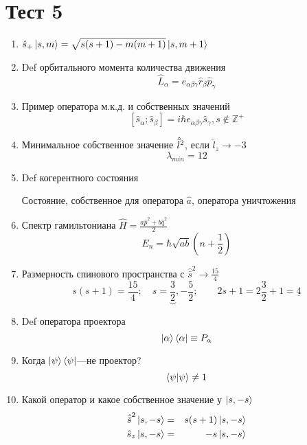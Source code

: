 \section*{Тест 5}
\begin{enumerate}
    \item $\Hat s_+ \ket{s,m} = \sqrt{s(s+1)-m(m+1)}\ket{s,m+1}$
    \item Def орбитального момента количества движения
        $$\hat L_\alpha = e_{\alpha\beta\gamma}\hat r_\beta \hat 
p_\gamma$$
    \item Пример оператора м.к.д. и собственных значений
$$[\hat s_\alpha;\hat s_\beta] = i\hbar e_{\alpha\beta\gamma}\hat 
s_\gamma, s\not \in \mathbb Z^+$$
    \item Минимальное собственное значение $\Hat{\bar l}^2$, если $\hat 
l_z \to -3$
$$\lambda_{min}=12$$
    \item Def когерентного состояния

        Состояние, собственное для оператора $\hat a$, оператора уничтожения
    \item Спектр гамильтониана $\hat H=\frac{a{\hat p}^2+b{\hat q}^2}{2}$
        $$E_n = \hbar\sqrt{ab}\left(n+\frac{1}{2}\right)$$
    \item Размерность спинового пространства с $\hat{\bar s}^2\to \frac{15}{4}$
        $$s(s+1)=\frac{15}{4};\quad s=\underbrace{\frac{3}{2}},-\frac{5}{2}; \qquad 2s+1=2\frac{3}{2}+1=\underline{4}$$
    \item Def оператора проектора
        $$\ket{\alpha}\bra{\alpha}\equiv P_\alpha$$
   \item Когда $\ket{\psi}\bra{\psi}$---не проектор?
       $$\braket{\psi|\psi}\neq 1$$
   \item Какой оператор и какое собственное значение у $\ket{s,-s}$
       \begin{eqnarray}
           {\Hat{\bar s}}^2\ket{s,-s}&=&s(s+1)\ket{s,-s}\\
           \hat s_z\ket{s,-s}&=&-s\ket{s,-s}
       \end{eqnarray}
\end{enumerate}
